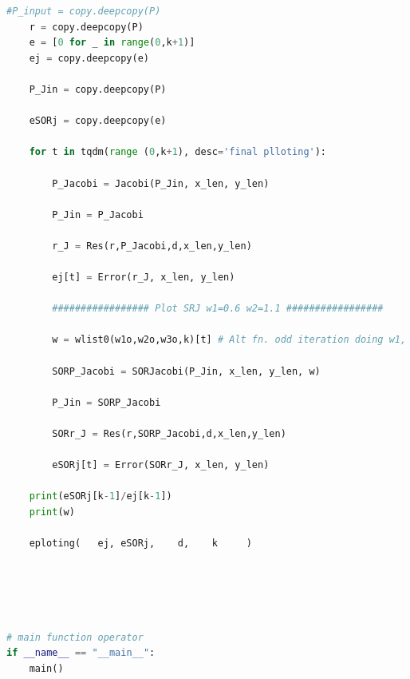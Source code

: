 \documentclass[12pt]{article}
\begin{document}
\begin{scriptsize}
\begin{lstlisting}[language=python,caption={(4)-The python Source code}]
    #P_input = copy.deepcopy(P)
    r = copy.deepcopy(P)
    e = [0 for _ in range(0,k+1)]
    ej = copy.deepcopy(e)

    P_Jin = copy.deepcopy(P)    

    eSORj = copy.deepcopy(e)

    for t in tqdm(range (0,k+1), desc='final plloting'):
        
        P_Jacobi = Jacobi(P_Jin, x_len, y_len)

        P_Jin = P_Jacobi

        r_J = Res(r,P_Jacobi,d,x_len,y_len)

        ej[t] = Error(r_J, x_len, y_len)
        
        ################# Plot SRJ w1=0.6 w2=1.1 #################
        
        w = wlist0(w1o,w2o,w3o,k)[t] # Alt fn. odd iteration doing w1, even iteration doing w2
                 
        SORP_Jacobi = SORJacobi(P_Jin, x_len, y_len, w)

        P_Jin = SORP_Jacobi

        SORr_J = Res(r,SORP_Jacobi,d,x_len,y_len)

        eSORj[t] = Error(SORr_J, x_len, y_len)

    print(eSORj[k-1]/ej[k-1])
    print(w)
    
    eploting(   ej, eSORj,    d,    k     )





# main function operator
if __name__ == "__main__":
    main()







\end{lstlisting}
\end{scriptsize}



\end{document}
